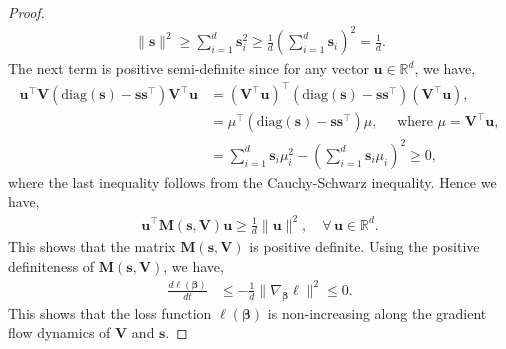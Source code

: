 \documentclass[10pt,a4paper]{amsart}
\newcommand{\MM}{\mathbf{M}}
\newcommand{\R}{\mathbb{R}}
\newcommand{\VV}{\mathbf{V}}
\newcommand{\bbeta}{\bm{\beta}}
\newcommand{\bloss}{\ell}
\newcommand{\diag}[1]{\mathrm{diag}\left(#1\right)}
\renewcommand\geq{\geqslant}
\renewcommand\leq{\leqslant}
\providecommand{\nor}[1]{\bigl\|{#1}\bigr\|}
\newcommand{\sos}{\bm{s}}
\newcommand{\sosi}[1]{\bm{s}_{#1}}
\newcommand{\uu}{\bm{u}}
\begin{document}
\begin{proof}
    \begin{align*}
        \nor{\sos}^2  \geq \sum_{i=1}^{d} \sosi{i}^2 \geq \frac{1}{d} \left( \sum_{i=1}^{d} \sosi{i} \right)^2 = \frac{1}{d}.
    \end{align*}
    The next term is positive semi-definite since for any vector $\uu \in \R^{d}$, we have,
    \begin{align*}
        \uu^{\top} \VV \left( \diag{\sos} - \sos \sos^{\top} \right) \VV^{\top} \uu &= \left( \VV^{\top} \uu \right)^{\top} \left( \diag{\sos} - \sos \sos^{\top} \right) \left( \VV^{\top} \uu \right), \\
        &= \mu^{\top} \left( \diag{\sos} - \sos \sos^{\top} \right) \mu, \quad \text{ where } \mu = \VV^{\top} \uu, \\
        &= \sum_{i=1}^{d} \sosi{i} \mu_i^2 - \left( \sum_{i=1}^{d} \sosi{i} \mu_i \right)^2 \geq 0,
    \end{align*}
    where the last inequality follows from the Cauchy-Schwarz inequality. Hence we have,
    \begin{align*}
        \uu^{\top} \MM(\sos, \VV) \uu \geq \frac{1}{d} \nor{\uu}^2, \quad \forall \, \uu \in \R^{d}.
    \end{align*}
    This shows that the matrix $\MM(\sos, \VV)$ is positive definite. Using the positive definiteness of $\MM(\sos, \VV)$, we have,
    \begin{align*}
        \frac{d \bloss(\bbeta)}{dt} &\leq - \frac{1}{d} \nor{\nabla_{\bbeta} \bloss}^2 \leq 0.
    \end{align*}
    This shows that the loss function $\bloss(\bbeta)$ is non-increasing along the gradient flow dynamics of $\VV$ and $\sos$.
\end{proof}
\end{document}
